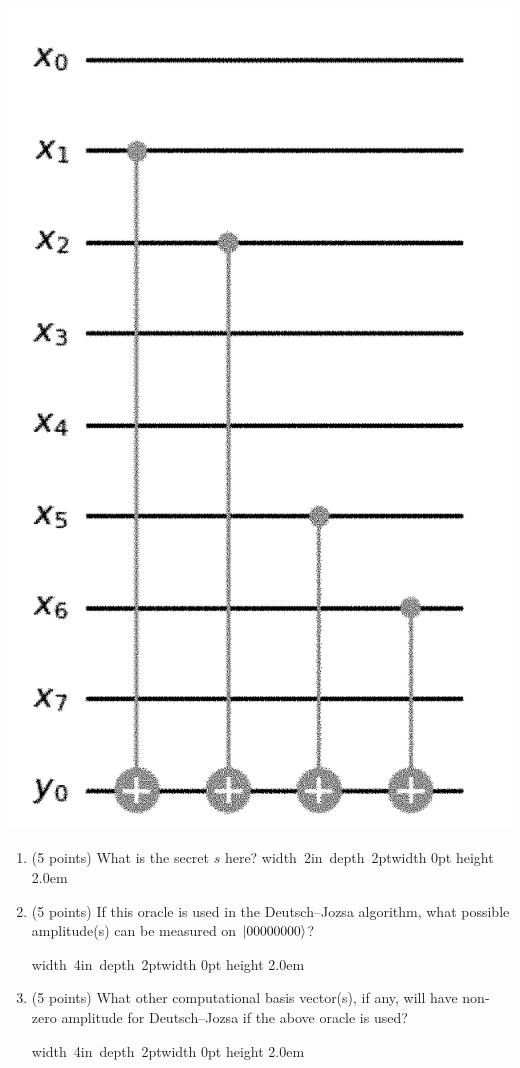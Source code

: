 \documentclass[12pt]{article}
\newcommand{\Blank}[1][1in]{\mbox{\hskip 4pt\vrule width #1 depth 2pt}\vrule width 0pt height 2.0em}
\begin{document}
\begin{enumerate}[font=\bfseries]
    \includegraphics[scale=0.4]{ps7_assets/bv.png}
\begin{enumerate}
\item (5 points)
    What is the secret $s$ here? \Blank[2in]{}
    \item (5 points) If this oracle is used in the Deutsch--Jozsa algorithm, what possible amplitude(s) can be measured on $\ket{00000000}$?
    
    \Blank[4in]{}
    \item (5 points) What other computational basis vector(s), if any, will have non-zero amplitude for Deutsch--Jozsa if the above oracle is used?  
    
    \Blank[4in]{}
\end{enumerate}


\end{enumerate}
\end{document}
